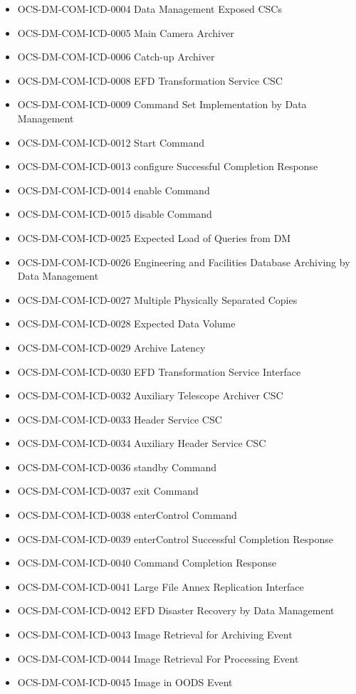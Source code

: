 \begin{itemize}
\item OCS-DM-COM-ICD-0004 Data Management Exposed CSCs
\item OCS-DM-COM-ICD-0005 Main Camera Archiver
\item OCS-DM-COM-ICD-0006 Catch-up Archiver
\item OCS-DM-COM-ICD-0008 EFD Transformation Service CSC
\item OCS-DM-COM-ICD-0009 Command Set Implementation by Data Management
\item OCS-DM-COM-ICD-0012 Start Command
\item OCS-DM-COM-ICD-0013 configure Successful Completion Response
\item OCS-DM-COM-ICD-0014 enable Command
\item OCS-DM-COM-ICD-0015 disable Command
\item OCS-DM-COM-ICD-0025 Expected Load of Queries from DM
\item OCS-DM-COM-ICD-0026 Engineering and Facilities Database Archiving by Data Management
\item OCS-DM-COM-ICD-0027 Multiple Physically Separated Copies
\item OCS-DM-COM-ICD-0028 Expected Data Volume
\item OCS-DM-COM-ICD-0029 Archive Latency
\item OCS-DM-COM-ICD-0030 EFD Transformation Service Interface
\item OCS-DM-COM-ICD-0032 Auxiliary Telescope Archiver CSC
\item OCS-DM-COM-ICD-0033 Header Service CSC
\item OCS-DM-COM-ICD-0034 Auxiliary Header Service CSC
\item OCS-DM-COM-ICD-0036 standby Command
\item OCS-DM-COM-ICD-0037 exit Command
\item OCS-DM-COM-ICD-0038 enterControl Command
\item OCS-DM-COM-ICD-0039 enterControl Successful Completion Response
\item OCS-DM-COM-ICD-0040 Command Completion Response
\item OCS-DM-COM-ICD-0041 Large File Annex Replication Interface
\item OCS-DM-COM-ICD-0042 EFD Disaster Recovery by Data Management
\item OCS-DM-COM-ICD-0043 Image Retrieval for Archiving Event
\item OCS-DM-COM-ICD-0044 Image Retrieval For Processing Event
\item OCS-DM-COM-ICD-0045 Image in OODS Event

\end{itemize}
